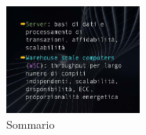 
\FloatBarrier
\begin{figure}[H]
  \centering
  \includegraphics[width=0.40\textwidth,
                    trim=40 80 10 40, %
                    clip]
                    {images/Lez03_p01_fig_05.png}
  \caption{Sommario}
  \label{fig:Lez03_p01_fig_05}
\end{figure}
\FloatBarrier
\noindent

